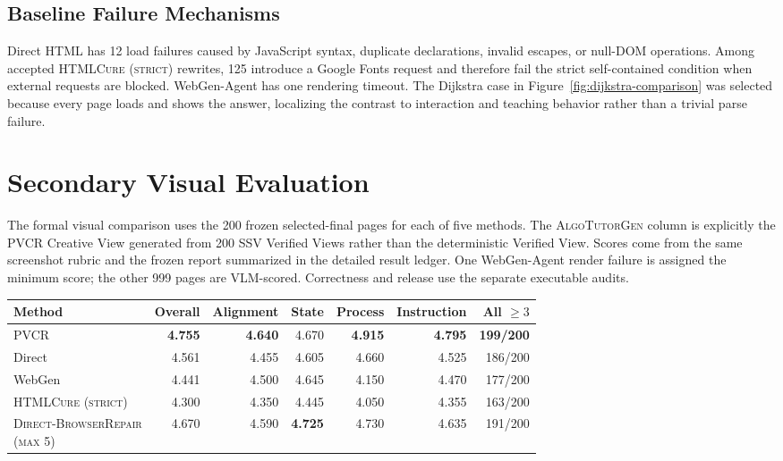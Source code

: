 \documentclass[letterpaper]{article}
\newcommand{\system}{\textsc{AlgoTutorGen}}
\newcommand{\ssv}{\textsc{SSV}}
\newcommand{\pvcr}{\textsc{PVCR}}
\newcommand{\htmlcure}{\textsc{HTMLCure (strict)}}
\newenvironment{coltable}
  {\begin{center}\begin{minipage}{\columnwidth}\centering}
  {\end{minipage}\end{center}}
\begin{document}
\subsection{Baseline Failure Mechanisms}

Direct HTML has 12 load failures caused by JavaScript syntax, duplicate declarations, invalid escapes, or null-DOM operations. Among accepted \htmlcure{} rewrites, 125 introduce a Google Fonts request and therefore fail the strict self-contained condition when external requests are blocked. WebGen-Agent has one rendering timeout. The Dijkstra case in Figure~\ref{fig:dijkstra-comparison} was selected because every page loads and shows the answer, localizing the contrast to interaction and teaching behavior rather than a trivial parse failure.

\section{Secondary Visual Evaluation}

The formal visual comparison uses the 200 frozen selected-final pages for each of five methods. The \system{} column is explicitly the \pvcr{} Creative View generated from 200 \ssv{} Verified Views rather than the deterministic Verified View. Scores come from the same screenshot rubric and the frozen  report summarized in the detailed result ledger. One WebGen-Agent render failure is assigned the minimum score; the other 999 pages are VLM-scored. Correctness and release use the separate executable audits.

\begin{coltable}
\scriptsize
\setlength{\tabcolsep}{2pt}
\begin{tabular}{@{}lrrrrrr@{}}
\toprule
Method & Overall & Alignment & State & Process & Instruction & All $\geq3$ \\
\midrule
\pvcr{} & \textbf{4.755} & \textbf{4.640} & 4.670 & \textbf{4.915} & \textbf{4.795} & \textbf{199/200} \\
Direct & 4.561 & 4.455 & 4.605 & 4.660 & 4.525 & 186/200 \\
WebGen & 4.441 & 4.500 & 4.645 & 4.150 & 4.470 & 177/200 \\
\htmlcure{} & 4.300 & 4.350 & 4.445 & 4.050 & 4.355 & 163/200 \\
\shortstack[l]{\textsc{Direct-BrowserRepair}\\\textsc{(max 5)}} & 4.670 & 4.590 & \textbf{4.725} & 4.730 & 4.635 & 191/200 \\
\bottomrule
\end{tabular}
\label{tab:visual}
\end{coltable}
\end{document}
